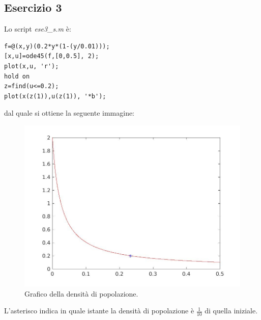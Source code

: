 \documentclass[11pt,a4paper,twoside,openright,titlepage,
headinclude,footinclude,BCOR5mm,
numbers=noenddot,cleardoublepage=empty,
tablecaptionabove]{scrbook}
\begin{document}
\subsection{Esercizio 3}
Lo script \emph{ese3\_s.m} è:
\begin{lstlisting}[frame=trBL]
f=@(x,y)(0.2*y*(1-(y/0.01)));
[x,u]=ode45(f,[0,0.5], 2);
plot(x,u, 'r');
hold on
z=find(u<=0.2);
plot(x(z(1)),u(z(1)), '*b');
\end{lstlisting}
dal quale si ottiene la seguente immagine:
\begin{center}
\begin{figure}[h!]
\includegraphics[width=\textwidth]{figs/ese3_s.jpg}
\caption{Grafico della densità di popolazione.}
\end{figure}
\end{center}
L'asterisco indica in quale istante la densità di popolazione è 
$\frac{1}{10}$ di quella iniziale.
\end{document}
